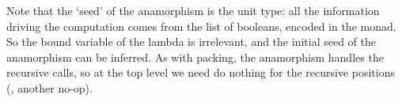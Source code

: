 \documentclass[fleqn,runningheads]{llncs}
\begin{document}
\begin{AgdaAlign}
\begin{code}
\AgdaSymbol{)}\AgdaSpace{}%
%
\>[21]\AgdaSymbol{=}\AgdaSpace{}%
\AgdaSpace{}%
\AgdaSpace{}%
\AgdaSpace{}%
\AgdaBound{\AgdaUnderscore{}}\AgdaSpace{}%
\AgdaSpace{}%
\AgdaSpace{}%
\AgdaSpace{}%
\AgdaSpace{}%
\AgdaSymbol{)}\AgdaSpace{}%
\AgdaSymbol{\AgdaUnderscore{}}\<%
\end{code}
Note that the `seed' of the anamorphism is the unit type: all the information driving the computation comes from the list of booleans, encoded in the monad. So the bound variable of the lambda is irrelevant, and the initial seed of the anamorphism can be inferred. As with packing, the anamorphism handles the recursive calls, so at the top level we need do nothing for the recursive positions (, another no-op).


\end{AgdaAlign}
\end{document}
